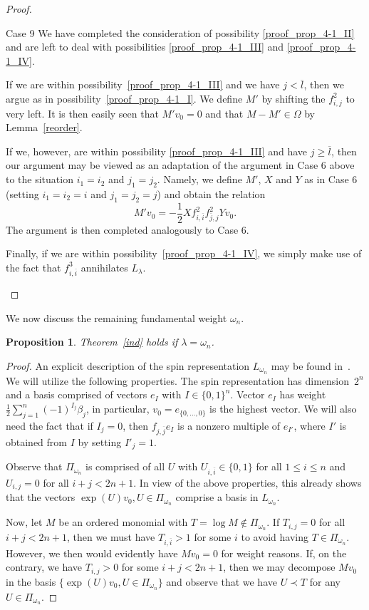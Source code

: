 \documentclass[10pt,a4paper]{article}
\newtheorem{prop}[theo]{Proposition}
\theoremstyle{remark}\newtheorem{rema}[theo]{Remark}
\newenvironment{enonce*}[2][]{\par\smallskip\noindent\textbf{#2.}\ }{\par\smallskip}
\newcommand{\la}{\lambda}
\begin{document}
\begin{proof}
\begin{enonce*}[remark]{Case 9}
We have completed the consideration of possibility \ref{proof_prop_4-1_II} and are left to deal with possibilities \ref{proof_prop_4-1_III} and \ref{proof_prop_4-1_IV}.

If we are within possibility~\ref{proof_prop_4-1_III} and we have $j<\overline l$, then we argue as in possibility~\ref{proof_prop_4-1_I}. We define $M'$ by shifting the $f_{i,j}^2$ to very left. It is then easily seen that $M'v_0=0$ and that $M-M'\in\Omega$ by Lemma~\ref{reorder}.

If we, however, are within possibility \ref{proof_prop_4-1_III} and have $j\ge\overline l$, then our argument may be viewed as an adaptation of the argument in Case 6 above to the situation $i_1=i_2$ and $j_1=j_2$. Namely, we define $M'$, $X$ and $Y$ as in Case 6 (setting $i_1=i_2=i$ and $j_1=j_2=j$) and obtain the relation
\[
M'v_0=-\frac12Xf_{i,\overline i}^2f_{\overline j,j}^2Yv_0.
\]
The argument is then completed analogously to Case 6.

Finally, if we are within possibility~\ref{proof_prop_4-1_IV}, we simply make use of the fact that $f_{i,\overline i}^3$ annihilates $L_\lambda$.\qedhere
\end{enonce*}
\end{proof}

We now discuss the remaining fundamental weight $\omega_n$.

\begin{prop}
Theorem~\ref{ind} holds if $\la=\omega_n$.
\end{prop}
\begin{proof}
An explicit description of the spin representation $L_{\omega_n}$ may be found in~\cite{carter}. We will utilize the following properties. The spin representation has dimension~$2^n$ and a basis comprised of vectors $e_I$ with $I\in\{0,1\}^n$. Vector $e_I$ has weight $\frac12\sum_{j=1}^n (-1)^{I_j}\beta_j$, in particular, $v_0=e_{\{0,\dots,0\}}$ is the highest vector. We will also need the fact that if $I_j=0$, then $f_{j,\overline j}e_{I}$ is a nonzero multiple of $e_{I'}$, where $I'$ is obtained from $I$ by setting $I'_j=1$.

Observe that $\Pi_{\omega_n}$ is comprised of all $U$ with $U_{i,\overline i}\in\{0,1\}$ for all $1\le i\le n$ and $U_{i,j}=0$ for all $i+j<2n+1$. In view of the above properties, this already shows that the vectors $\exp(U)v_0,U\in\Pi_{\omega_n}$ comprise a basis in $L_{\omega_n}$.

Now, let $M$ be an ordered monomial with $T=\log M\notin\Pi_{\omega_n}$. If $T_{i,j}=0$ for all $i+j<2n+1$, then we must have $T_{i,\overline i}>1$ for some $i$ to avoid having $T\in\Pi_{\omega_n}$. However, we then would evidently have $Mv_0=0$ for weight reasons. If, on the contrary, we have $T_{i,j}>0$ for some $i+j<2n+1$, then we may decompose $Mv_0$ in the basis $\{\exp(U)v_0,U\in\Pi_{\omega_n}\}$ and observe that we have $U\prec T$ for any $U\in\Pi_{\omega_n}$.
\end{proof}
\end{document}
